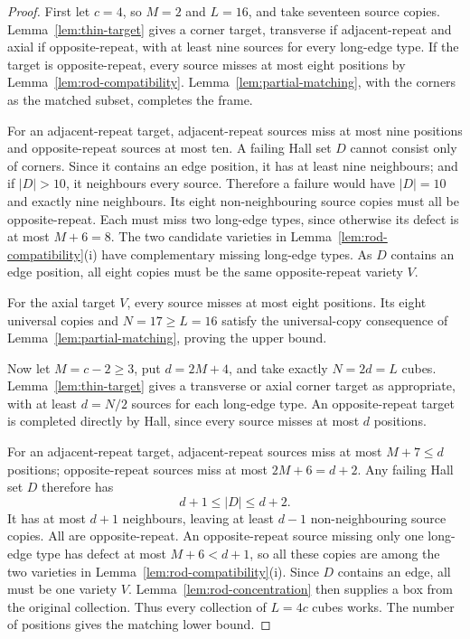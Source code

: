 \begin{proof}
First let $c=4$, so $M=2$ and $L=16$, and take seventeen source
copies. Lemma~\ref{lem:thin-target} gives a corner target, transverse if
adjacent-repeat and axial if opposite-repeat, with at least nine sources
for every long-edge type.
If the target is opposite-repeat, every source misses at most eight positions
by Lemma~\ref{lem:rod-compatibility}. Lemma~\ref{lem:partial-matching},
with the corners as the matched subset, completes the frame.

For an adjacent-repeat target, adjacent-repeat sources miss at most nine
positions and opposite-repeat sources at most ten. A failing Hall set
$D$ cannot consist only of corners. Since it contains an edge position,
it has at least nine neighbours; and if $|D|>10$, it neighbours every
source. Therefore a failure would have $|D|=10$ and exactly nine
neighbours. Its eight non-neighbouring source copies must all be
opposite-repeat. Each must miss two long-edge types, since otherwise
its defect is at most $M+6=8$. The two candidate varieties in
Lemma~\ref{lem:rod-compatibility}(i) have complementary missing
long-edge types. As $D$ contains an edge position, all eight copies
must be the same opposite-repeat variety $V$.

For the axial target $V$, every source misses at most eight positions.
Its eight universal copies and $N=17\ge L=16$ satisfy the universal-copy
consequence of Lemma~\ref{lem:partial-matching}, proving the upper bound.

Now let $M=c-2\ge3$, put $d=2M+4$, and take exactly $N=2d=L$
cubes. Lemma~\ref{lem:thin-target} gives a transverse or axial corner
target as appropriate, with at least $d=N/2$ sources for each long-edge type. An opposite-repeat
target is completed directly by Hall, since every source misses at
most $d$ positions.

For an adjacent-repeat target, adjacent-repeat sources miss at most
$M+7\le d$ positions; opposite-repeat sources miss at most
$2M+6=d+2$. Any failing Hall set $D$ therefore has
\[
 d+1\le |D|\le d+2.
\]
It has at most $d+1$ neighbours, leaving at least $d-1$ non-neighbouring
source copies. All are opposite-repeat. An opposite-repeat source
missing only one long-edge type has defect at most $M+6<d+1$, so
all these copies are among the two varieties in
Lemma~\ref{lem:rod-compatibility}(i). Since $D$ contains an edge,
all must be one variety $V$. Lemma~\ref{lem:rod-concentration} then
supplies a box from the original collection. Thus every collection of
$L=4c$ cubes works. The number of positions gives the matching lower
bound.
\end{proof}

